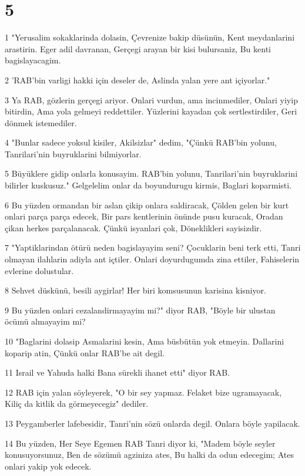 \chapter{5}

\par 1 "Yerusalim sokaklarinda dolasin, Çevrenize bakip düsünün, Kent meydanlarini arastirin. Eger adil davranan, Gerçegi arayan bir kisi bulursaniz, Bu kenti bagislayacagim.
\par 2 'RAB'bin varligi hakki için deseler de, Aslinda yalan yere ant içiyorlar."
\par 3 Ya RAB, gözlerin gerçegi ariyor. Onlari vurdun, ama incinmediler, Onlari yiyip bitirdin, Ama yola gelmeyi reddettiler. Yüzlerini kayadan çok sertlestirdiler, Geri dönmek istemediler.
\par 4 "Bunlar sadece yoksul kisiler, Akilsizlar" dedim, "Çünkü RAB'bin yolunu, Tanrilari'nin buyruklarini bilmiyorlar.
\par 5 Büyüklere gidip onlarla konusayim. RAB'bin yolunu, Tanrilari'nin buyruklarini bilirler kuskusuz." Gelgelelim onlar da boyundurugu kirmis, Baglari koparmisti.
\par 6 Bu yüzden ormandan bir aslan çikip onlara saldiracak, Çölden gelen bir kurt onlari parça parça edecek, Bir pars kentlerinin önünde pusu kuracak, Oradan çikan herkes parçalanacak. Çünkü isyanlari çok, Döneklikleri sayisizdir.
\par 7 "Yaptiklarindan ötürü neden bagislayayim seni? Çocuklarin beni terk etti, Tanri olmayan ilahlarin adiyla ant içtiler. Onlari doyurdugumda zina ettiler, Fahiselerin evlerine dolustular.
\par 8 Sehvet düskünü, besili aygirlar! Her biri komsusunun karisina kisniyor.
\par 9 Bu yüzden onlari cezalandirmayayim mi?" diyor RAB, "Böyle bir ulustan öcümü almayayim mi?
\par 10 "Baglarini dolasip Asmalarini kesin, Ama büsbütün yok etmeyin. Dallarini koparip atin, Çünkü onlar RAB'be ait degil.
\par 11 Israil ve Yahuda halki Bana sürekli ihanet etti" diyor RAB.
\par 12 RAB için yalan söyleyerek, "O bir sey yapmaz. Felaket bize ugramayacak, Kiliç da kitlik da görmeyecegiz" dediler.
\par 13 Peygamberler lafebesidir, Tanri'nin sözü onlarda degil. Onlara böyle yapilacak.
\par 14 Bu yüzden, Her Seye Egemen RAB Tanri diyor ki, "Madem böyle seyler konusuyorsunuz, Ben de sözümü agziniza ates, Bu halki da odun edecegim; Ates onlari yakip yok edecek.
